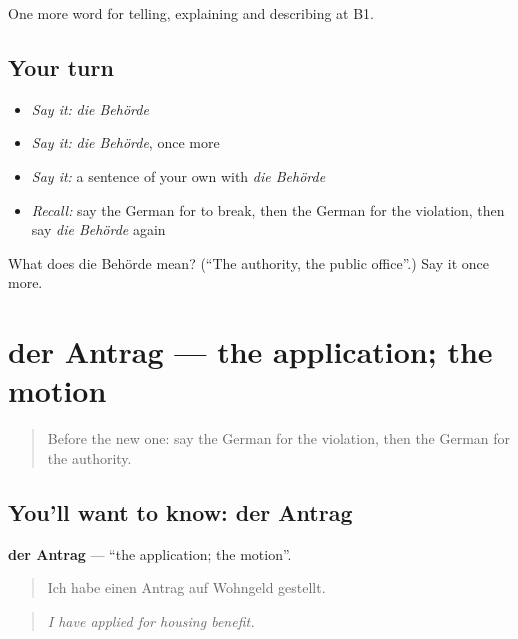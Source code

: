 \begin{grammarlens}[title={What you've built}]
One more word for telling, explaining and describing at B1.
\end{grammarlens}

\subsection*{Your turn}
\begin{itemize}
\raggedright
  \item \emph{Say it:} \emph{die Behörde}
  \item \emph{Say it:} \emph{die Behörde}, once more
  \item \emph{Say it:} a sentence of your own with \emph{die Behörde}
  \item \emph{Recall:} say the German for to break, then the German for the violation, then say \emph{die Behörde} again
\end{itemize}

\begin{tcolorbox}[breakable,colback=teal!4,colframe=teal!35!black,title={Before you move on}]
What does die Behörde mean? (\textquotedblleft{}The authority, the public office\textquotedblright{}.) Say it once more.
\end{tcolorbox}
\section[der Antrag]{der Antrag — the application; the motion}

\label{lesson:GE-C383-antrag}



\begin{quote}
Before the new one: say the German for the violation, then the German for the authority.
\end{quote}

\subsection*{You'll want to know: der Antrag}
\textbf{der Antrag} — \textquotedblleft{}the application; the motion\textquotedblright{}.

\begin{quote}
Ich habe einen Antrag auf Wohngeld gestellt.
\end{quote}

\begin{quote}
\emph{I have applied for housing benefit.}
\end{quote}

